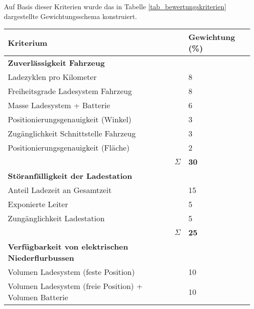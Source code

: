 Auf Basis dieser Kriterien wurde das in Tabelle \ref{tab_bewertungskriterien} dargestellte Gewichtungsschema konstruiert.
\begin{table}
	\centering
	\begin{tabularx}{\linewidth}{Xrl}
		\toprule
		Kriterium                                                &                   & Gewichtung (\%) \\ \midrule
		\textbf{Zuverlässigkeit Fahrzeug}                        &                   &  \\
		Ladezyklen pro Kilometer                                 &                   & 8               \\
		Freiheitsgrade Ladesystem Fahrzeug                       &                   & 8               \\
		Masse Ladesystem + Batterie                              &                   & 6               \\
		Positionierungsgenauigkeit (Winkel)                      &                   & 3               \\
		Zugänglichkeit Schnittstelle Fahrzeug                    &                   & 3               \\
		Positionierungsgenauigkeit (Fläche)                      &                   & 2               \\ \midrule
		                                                         &          $\Sigma$ & \textbf{30}     \\
		\textbf{Störanfälligkeit der Ladestation}                &                   &  \\
		Anteil Ladezeit an Gesamtzeit                            &                   & 15             \\
		Exponierte Leiter                                        &                   & 5             \\
		Zungänglichkeit Ladestation                              &                   & 5 \\ \midrule
		                                                         &          $\Sigma$ & \textbf{25}     \\
		\textbf{Verfügbarkeit von elektrischen Niederflurbussen} &                   &  \\
		Volumen Ladesystem (feste Position)                      &                   & 10              \\
		Volumen Ladesystem (freie Position) + Volumen Batterie   &                   & 10              \\ \midrule

\end{tabularx}
\end{table}
